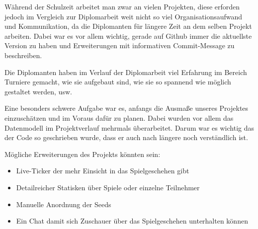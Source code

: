 Während der Schulzeit arbeitet man zwar an vielen Projekten,
diese erforden jedoch im Vergleich zur Diplomarbeit weit nicht so viel Organisationsaufwand und Kommunikation, da die Diplomanten
für längere Zeit an dem selben Projekt arbeiten. Dabei war es vor allem wichtig, gerade auf Github immer die aktuellste Version zu haben und Erweiterungen mit
informativen Commit-Message zu beschreiben. 

Die Diplomanten haben im Verlauf der Diplomarbeit viel Erfahrung im Bereich Turniere gemacht, wie sie aufgebaut sind, wie sie so spannend wie möglich gestaltet werden, 
usw.

Eine besonders schwere Aufgabe war es, anfangs die Ausmaße unseres Projektes einzuschätzen und im Voraus dafür zu planen. Dabei wurden vor allem das Datenmodell im Projektverlauf mehrmals überarbeitet.
Darum war es wichtig das der Code so geschrieben wurde, dass er auch nach längere noch verständlich ist.

Mögliche Erweiterungen des Projekts könnten sein:

\begin{itemize}
    \item Live-Ticker der mehr Einsicht in das Spielgeschehen gibt
    \item Detailreicher Statisken über Spiele oder einzelne Teilnehmer
    \item Manuelle Anordnung der Seeds
    \item Ein Chat damit sich Zuschauer über das Spielgeschehen unterhalten können
\end{itemize}